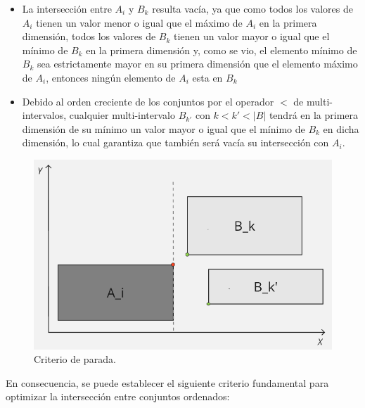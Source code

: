 \begin{itemize}
     \item La intersección entre $A_i$ y $B_k$ resulta vacía, ya que como todos los valores de $A_i$ tienen un valor menor o igual que el máximo de $A_i$ en la primera dimensión, todos los valores de $B_k$ tienen un valor mayor o igual que el mínimo de $B_k$ en la primera dimensión y, como se vio, el elemento mínimo de $B_k$ sea estrictamente mayor en su primera dimensión que el elemento máximo de $A_i$, entonces ningún elemento de $A_i$ esta en $B_k$
    
    \item Debido al orden creciente de los conjuntos por el operador $<$ de multi-intervalos, cualquier multi-intervalo $B_{k'}$ con $k < k' < |B|$ tendrá en la primera dimensión de su mínimo un valor mayor o igual que el mínimo de $B_k$ en dicha dimensión, lo cual garantiza que también será vacía su intersección con $A_i$.
\end{itemize}

\begin{figure}[h]
    \centering
    \includegraphics[width=0.75\linewidth]{figures/Optimazaciones/Interseccion/criterio de parada.png}
    \caption{Criterio de parada.}
    \label{fig:criterio-parada}
\end{figure}

En consecuencia, se puede establecer el siguiente criterio fundamental para optimizar la intersección entre conjuntos ordenados:

